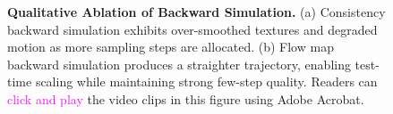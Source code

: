 \begin{figure}[!tb]
    \centering
      \caption{\textbf{Qualitative Ablation of Backward Simulation.} (a) Consistency backward simulation exhibits over-smoothed textures and degraded motion as more sampling steps are allocated. (b) Flow map backward simulation produces a straighter trajectory, enabling test-time scaling while maintaining strong few-step quality. Readers can \textcolor{magenta}{click and play} the video clips in this figure using Adobe Acrobat.}
\label{fig:ablation_backward_simulation}
\end{figure}
